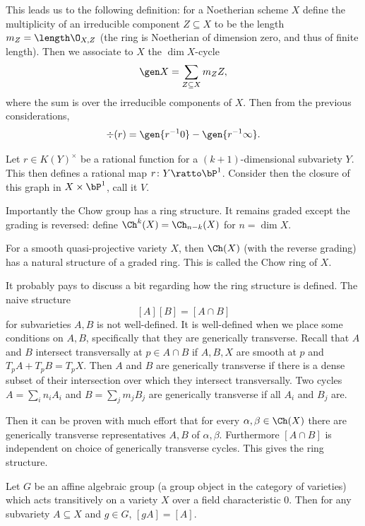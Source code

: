 This leads us to the following definition: for a Noetherian scheme $X$ define the {\emphcolor multiplicity} of an irreducible
component $Z\subseteq X$ to be the length $m_Z=\length\O_{X,Z}$ (the ring is Noetherian of dimension zero, and thus of finite length).
Then we associate to $X$ the $\dim X$-cycle
$$ \gen X = \sum_{Z\subseteq X}m_ZZ , $$
where the sum is over the irreducible components of $X$.
Then from the previous considerations,
$$ \div(r) = \gen{r^{-1}0} - \gen{r^{-1}\infty} . $$

Let $r\in K(Y)^\times$ be a rational function for a $(k+1)$-dimensional subvariety $Y$.
This then defines a rational map $r\colon Y\ratto\bP^1$.
Consider then the closure of this graph in $X\times\bP^1$, call it $V$.

Importantly the Chow group has a ring structure.
It remains graded except the grading is reversed: define $\Ch^k(X)=\Ch_{n-k}(X)$ for $n=\dim X$.

\bthrm

    For a smooth quasi-projective variety $X$, then $\Ch(X)$ (with the reverse grading) has a natural
    structure of a graded ring.
    This is called the {\emphcolor Chow ring} of $X$.

\ethrm

\bremark

    It probably pays to discuss a bit regarding how the ring structure is defined.
    The naive structure
    $$ [A][B] = [A\cap B] $$
    for subvarieties $A,B$ is not well-defined.
    It is well-defined when we place some conditions on $A,B$, specifically that they are
    {\emphcolor generically transverse}.
    Recall that $A$ and $B$ intersect transversally at $p\in A\cap B$ if $A,B,X$ are smooth at $p$ and
    $T_pA+T_pB=T_pX$.
    Then $A$ and $B$ are generically transverse if there is a dense subset of their intersection over which
    they intersect transversally.
    Two cycles $A=\sum_in_iA_i$ and $B=\sum_jm_jB_j$ are generically transverse if all $A_i$ and $B_j$ are.

    Then it can be proven with much effort that for every $\alpha,\beta\in\Ch(X)$ there are generically
    transverse representatives $A,B$ of $\alpha,\beta$.
    Furthermore $[A\cap B]$ is independent on choice of generically transverse cycles.
    This gives the ring structure.

\eremark

\bthrm[title={Kleiman}]

    Let $G$ be an affine algebraic group (a group object in the category of varieties) which acts transitively
    on a variety $X$ over a field characteristic $0$.
    Then for any subvariety $A\subseteq X$ and $g\in G$, $[gA]=[A]$.

\ethrm

\bye

